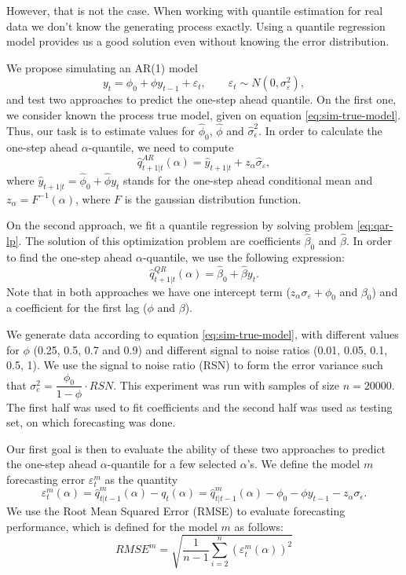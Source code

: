 However, that is not the case. When working with quantile estimation for real data we don't know the generating process exactly. Using a quantile regression model provides us a good solution even without knowing the error distribution. 

We propose simulating an AR(1) model
\begin{equation}
	y_t = \phi_0 +  \phi y_{t-1} + \varepsilon_t,\qquad \varepsilon_t \sim N(0, \sigma_\varepsilon^2),	
\label{eq:sim-true-model}
\end{equation}
and test two approaches to predict the one-step ahead quantile. On the first one, we consider known the process true model, given on equation \ref{eq:sim-true-model}. Thus, our task is to estimate values for $\hat{\phi}_0$, $\hat{\phi}$ and $\hat{\sigma}_\epsilon^2$. In order to calculate the one-step ahead $\alpha$-quantile, we need to compute
\begin{equation}
	\hat{q}^{AR}_{t+1|t}(\alpha) = \hat{y}_{t+1|t} + z_\alpha \hat{\sigma}_\varepsilon,
\end{equation}
where $\hat{y}_{t+1|t} = \hat{\phi}_0 + \hat{\phi} y_{t}$ stands for the one-step ahead conditional mean and $z_\alpha = F^{-1}(\alpha)$, where $F$ is the gaussian distribution function.

On the second approach, we fit a quantile regression by solving problem \ref{eq:qar-lp}. The solution of this optimization problem are coefficients $\hat{\beta}_0$ and $\hat{\beta}$. In order to find the one-step ahead $\alpha$-quantile, we use the following expression:
\begin{equation}
		\hat{q}^{QR}_{t+1|t}(\alpha) = \hat{\beta}_0 + \hat{\beta} y_{t}.
\end{equation}
Note that in both approaches we have one intercept term ($z_\alpha \sigma_\varepsilon + {\phi}_0$ and $\beta_0$) and a coefficient for the first lag ($\phi$ and $\beta$). 

We generate data according to equation \ref{eq:sim-true-model}, with different values for $\phi$ (0.25, 0.5, 0.7 and 0.9) and different signal to noise ratios (0.01, 0.05, 0.1, 0.5, 1). We use the signal to noise ratio (RSN) to form the error variance such that $\sigma_e^2 = \dfrac{\phi_0}{1-\phi} \cdot RSN$. This experiment was run with samples of size $n=20000$. The first half was used to fit coefficients and the second half was used as testing set, on which forecasting was done.

Our first goal is then to evaluate the ability of these two approaches to predict the one-step ahead $\alpha$-quantile for a few selected $\alpha$'s. We define the model $m$ forecasting error $\varepsilon_t^m$ as the quantity 
\begin{equation}
\varepsilon_t^m(\alpha) = \hat{q}^m_{t|t-1}(\alpha) - q_t(\alpha) = \hat{q}^m_{t|t-1}(\alpha) - \phi_0 - \phi y_{t-1} - z_\alpha \sigma_\epsilon.
\end{equation}
We use the Root Mean Squared Error (RMSE) to evaluate forecasting performance, which is defined for the model $m$ as follows:
\begin{equation}
RMSE^m = \sqrt{ \frac{1}{n-1} \sum_{i=2}^{n} \left( \varepsilon_t^m(\alpha) \right)^2}
\end{equation}

